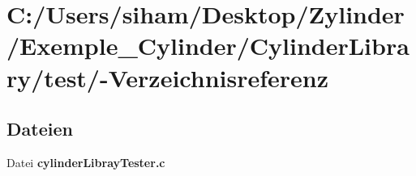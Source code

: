 \section{C:/Users/siham/Desktop/Zylinder/Exemple\_\-Cylinder/Cylinder\-Library/test/-Verzeichnisreferenz}
\label{dir_C_3A_2FUsers_2Fsiham_2FDesktop_2FZylinder_2FExemple_5FCylinder_2FCylinderLibrary_2Ftest_2F}


\subsection*{Dateien}
\begin{CompactItemize}
\item 
Datei {\bf cylinder\-Libray\-Tester.c}
\end{CompactItemize}
